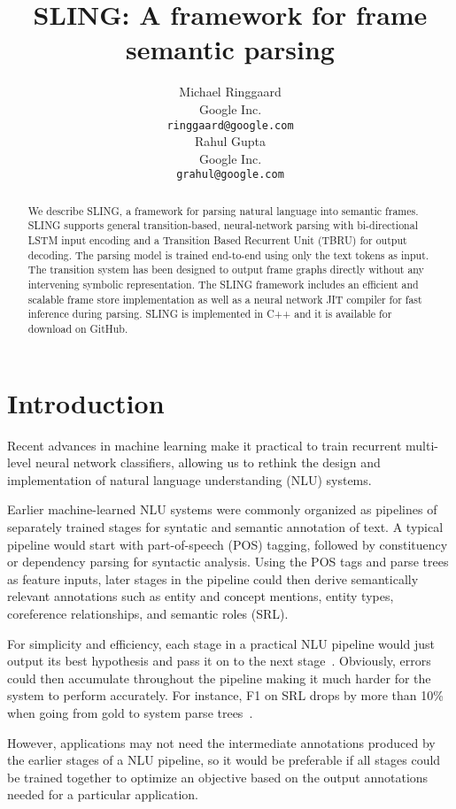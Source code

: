 \documentclass[11pt,a4paper]{article}
\title{SLING: A framework for frame semantic parsing}
\author{
Michael Ringgaard \\ Google Inc. \\ {\tt ringgaard@google.com} \\\And
Rahul Gupta \\ Google Inc. \\ {\tt grahul@google.com} \\
}
\begin{document}
\maketitle

\begin{abstract}
We describe SLING, a framework for parsing natural language into
semantic frames. SLING supports general transition-based, neural-network parsing with
bi-directional LSTM input encoding and a Transition Based Recurrent
Unit (TBRU) for output decoding. The parsing model is 
trained end-to-end using only the text tokens as input. The
transition system has been designed to output frame graphs directly without
any intervening symbolic representation.
The SLING framework includes an efficient and scalable frame store
implementation as well as a neural network JIT compiler for fast inference during parsing.
SLING is implemented in C++ and it is available for download
on GitHub.
\end{abstract}

\section{Introduction}

Recent advances in machine learning make it practical to train
recurrent multi-level neural network classifiers, allowing us to rethink the
design and implementation of natural language
understanding (NLU) systems.

Earlier machine-learned NLU systems were commonly organized as pipelines of
separately trained stages for syntatic and semantic annotation of text.
A typical  pipeline would start with part-of-speech (POS) tagging, followed by
constituency or dependency parsing for syntactic analysis.
Using the POS tags and parse trees as feature inputs, later stages in the pipeline could then
derive semantically relevant annotations such as entity and concept mentions, entity types, coreference relationships,
and semantic roles (SRL).

For simplicity and efficiency, each stage in a practical NLU pipeline would just output its best hypothesis
and pass it on to the next stage~\cite{finkel2006}.
Obviously, errors could then accumulate
throughout the pipeline making it much harder for the system to perform
accurately. For instance, F1 on SRL drops by more than 10\% when going from gold to
system parse trees~\cite{toutanova2005}.

However, applications may not need the intermediate annotations produced
by the earlier stages of a NLU pipeline, so it would be preferable if all stages
could be trained together to optimize an objective based on the output
annotations needed for a particular application.
\end{document}
